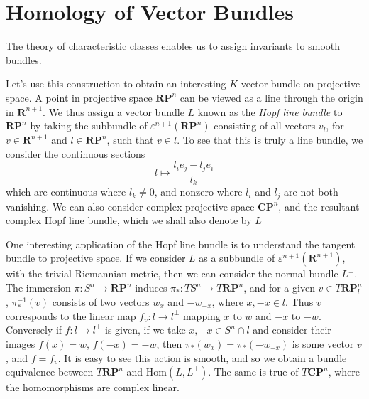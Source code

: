 \chapter{Homology of Vector Bundles}

The theory of characteristic classes enables us to assign invariants to smooth bundles.

Let's use this construction to obtain an interesting $K$ vector bundle on projective space. A point in projective space $\mathbf{RP}^n$ can be viewed as a line through the origin in $\mathbf{R}^{n+1}$. We thus assign a vector bundle $L$ known as the \emph{Hopf line bundle} to $\mathbf{RP}^n$ by taking the subbundle of $\varepsilon^{n+1}(\mathbf{RP}^n)$ consisting of all vectors $v_l$, for $v \in \mathbf{R}^{n+1}$ and $l \in \mathbf{RP}^n$, such that $v \in l$. To see that this is truly a line bundle, we consider the continuous sections
%
\[ l \mapsto \frac{l_i e_j - l_j e_i}{l_k} \]
%
which are continuous where $l_k \neq 0$, and nonzero where $l_i$ and $l_j$ are not both vanishing. We can also consider complex projective space $\mathbf{CP}^n$, and the resultant complex Hopf line bundle, which we shall also denote by $L$

One interesting application of the Hopf line bundle is to understand the tangent bundle to projective space. If we consider $L$ as a subbundle of $\varepsilon^{n+1}(\mathbf{R}^{n+1})$, with the trivial Riemannian metric, then we can consider the normal bundle $L^\perp$. The immersion $\pi: S^n \to \mathbf{RP}^n$ induces $\pi_*: TS^n \to T\mathbf{RP}^n$, and for a given $v \in T\mathbf{RP}^n_l$, $\pi_*^{-1}(v)$ consists of two vectors $w_x$ and $-w_{-x}$, where $x,-x \in l$. Thus $v$ corresponds to the linear map $f_v: l \to l^\perp$ mapping $x$ to $w$ and $-x$ to $-w$. Conversely if $f: l \to l^\perp$ is given, if we take $x,-x \in S^n \cap l$ and consider their images $f(x) = w$, $f(-x) = -w$, then $\pi_*(w_x) = \pi_*(-w_{-x})$ is some vector $v$, and $f = f_v$. It is easy to see this action is smooth, and so we obtain a bundle equivalence between $T\mathbf{RP}^n$ and $\text{Hom}(L,L^\perp)$. The same is true of $T\mathbf{CP}^n$, where the homomorphisms are complex linear.

